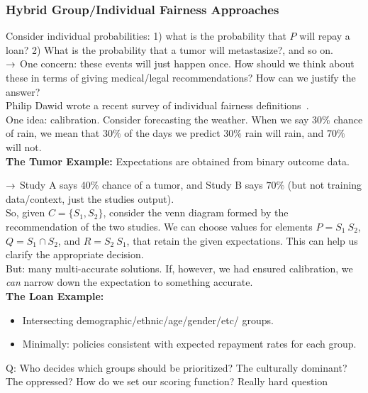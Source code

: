 \subsubsection{Hybrid Group/Individual Fairness Approaches}

Consider individual probabilities: 1) what is the probability that $P$ will repay a loan? 2) What is the probability that a tumor will metastasize?, and so on. \\

$\rightarrow$ One concern: these events will just happen once. How should we think about these in terms of giving medical/legal recommendations? How can we justify the answer? \\

Philip Dawid wrote a recent survey of individual fairness definitions~\cite{dawid2017individual}. \\

One idea: calibration. Consider forecasting the weather. When we say $30\%$ chance of rain, we mean that $30\%$ of the days we predict $30\%$ rain will rain, and $70\%$ will not. \\

{\bf The Tumor Example:} Expectations are obtained from binary outcome data.

$\rightarrow$ Study A says 40\% chance of a tumor, and Study B says $70\%$ (but not training data/context, just the studies output). \\

So, given $C = \{S_1, S_2\}$, consider the venn diagram formed by the recommendation of the two studies. We can choose values for elements $P = S_1 \ S_2$, $Q = S_1 \cap S_2$, and $R = S_2 \ S_1$, that retain the given expectations. This can help us clarify the appropriate decision. \\

But: many multi-accurate solutions. If, however, we had ensured calibration, we {\it can} narrow down the expectation to something accurate. \\

{\bf The Loan Example:}
\begin{itemize}
    \item Intersecting demographic/ethnic/age/gender/etc/ groups.
    \item Minimally: policies consistent with expected repayment rates for each group.
\end{itemize}

Q: Who decides which groups should be prioritized? The culturally dominant? The oppressed? How do we set our scoring function? Really hard question~\cite{jost1994role} \\


